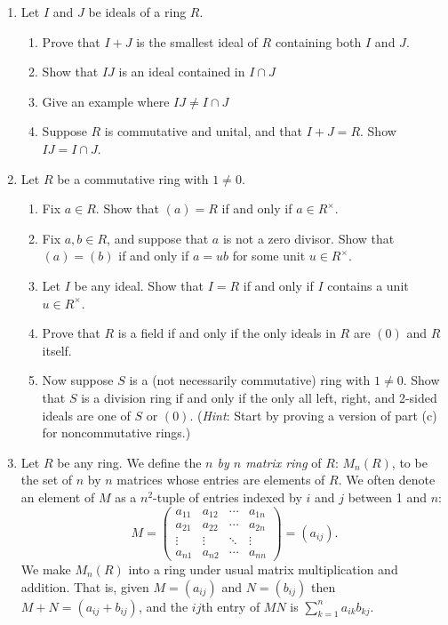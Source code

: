 \documentclass[11pt]{article}
\begin{document}
\begin{enumerate}
{  }
  \item{
  Let $I$ and $J$ be ideals of a ring $R$.
  \begin{enumerate}
    \item{Prove that $I+J$ is the smallest ideal of $R$ containing both $I$ and $J$.}
    \item{Show that $IJ$ is an ideal contained in $I\cap J$}
    \item{Give an example where $IJ\not=I\cap J$}
    \item{Suppose $R$ is commutative and unital, and that $I+J=R$.  Show $IJ=I\cap J$.}
  \end{enumerate}
  }
  \item{
  Let $R$ be a commutative ring with $1\not=0$.
  \begin{enumerate}
    \item{
    Fix $a\in R$.  Show that $(a)=R$ if and only if $a\in R^\times$.
    }
    \item{
    Fix $a,b\in R$, and suppose that $a$ is not a zero divisor.  Show that $(a)=(b)$ if and only if $a = ub$ for some unit $u\in R^\times$.
    }
    \item{
    Let $I$ be any ideal.  Show that $I=R$ if and only if $I$ contains a unit $u\in R^\times$.
    }
    \item{
    Prove that $R$ is a field if and only if the only ideals in $R$ are $(0)$ and $R$ itself.
    }
    \item{
    Now suppose $S$ is a (not necessarily commutative) ring with $1\not=0$.  Show that $S$ is a division ring if and only if the only all left, right, and 2-sided ideals are one of $S$ or $(0)$.  (\textit{Hint}: Start by proving a version of part (c) for noncommutative rings.)
    }
  \end{enumerate}
  }
  \item{
  Let $R$ be any ring.  We define the \textit{$n$ by $n$ matrix ring} of $R$: $M_n(R)$, to be the set of $n$ by $n$ matrices whose entries are elements of $R$.  We often denote an element of $M$ as a $n^2$-tuple of entries indexed by $i$ and $j$ between 1 and $n$:
  \[M =
  \begin{pmatrix}
    a_{11} & a_{12} & \cdots & a_{1n}\\
    a_{21} & a_{22} & \cdots & a_{2n}\\
    \vdots & \vdots & \ddots & \vdots\\
    a_{n1} & a_{n2} & \cdots & a_{nn}
  \end{pmatrix}
  = (a_{ij}).
  \]
  We make $M_n(R)$ into a ring under usual matrix multiplication and addition.  That is, given $M = (a_{ij})$ and $N=(b_{ij})$ then $M+N=(a_{ij}+b_{ij})$, and the $ij$th entry of $MN$ is $\sum_{k=1}^na_{ik}b_{kj}$.
}
\end{enumerate}
\end{document}
